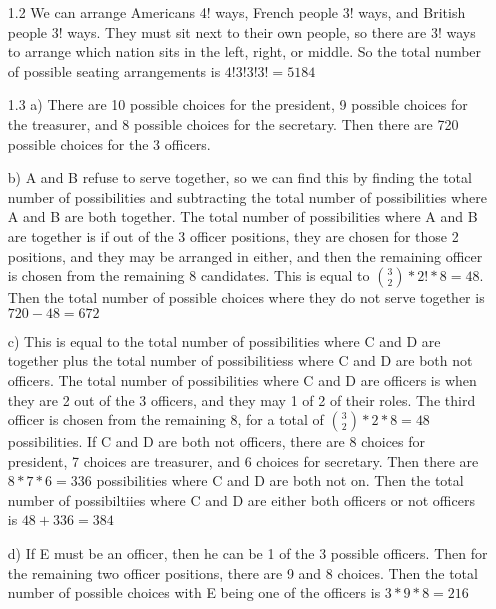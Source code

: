 \documentclass[11pt]{article}
\begin{document}
\begin{itemize}
\item[1.2]
	We can arrange Americans 4! ways, French people 3! ways, and British people 3! ways. They must sit next to their own people, so there are 3! ways to arrange which nation sits in the left, right, or middle. So the total number of possible seating arrangements is $4!3!3!3! = 5184$

\item[1.3]
	a) There are 10 possible choices for the president, 9 possible choices for the treasurer, and 8 possible choices for the secretary. Then there are 720 possible choices for the 3 officers.

	b) A and B refuse to serve together, so we can find this by finding the total number of possibilities and subtracting the total number of possibilities where A and B are both together. The total number of possibilities where A and B are together is if out of the 3 officer positions, they are chosen for those 2 positions, and they may be arranged in either, and then the remaining officer is chosen from the remaining 8 candidates. This is equal to $\binom{3}{2} * 2! * 8 = 48$. Then the total number of possible choices where they do not serve together is $720 - 48 = 672$

	c) This is equal to the total number of possibilities where C and D are together plus the total number of possibilitiess where C and D are both not officers. The total number of possibilities where C and D are officers is when they are 2 out of the 3 officers, and they may 1 of 2 of their roles. The third officer is chosen from the remaining 8, for a total of $\binom{3}{2} * 2 * 8 = 48$ possibilities. If C and D are both not officers, there are 8 choices for president, 7 choices are treasurer, and 6 choices for secretary. Then there are $8 * 7 * 6 = 336$ possibilities where C and D are both not on. Then the total number of possibiltiies where C and D are either both officers or not officers is $48 + 336 = 384$

	d) If E must be an officer, then he can be 1 of the 3 possible officers. Then for the remaining two officer positions, there are 9 and 8 choices. Then the total number of possible choices with E being one of the officers is $3 * 9 * 8 = 216$


\end{itemize}
\end{document}
